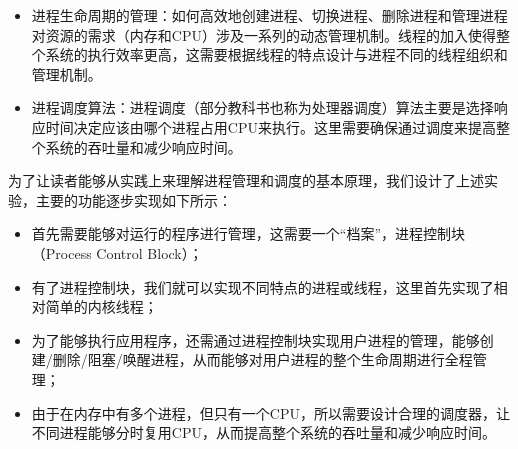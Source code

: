 \begin{itemize}
\item
  进程生命周期的管理：如何高效地创建进程、切换进程、删除进程和管理进程对资源的需求（内存和CPU）涉及一系列的动态管理机制。线程的加入使得整个系统的执行效率更高，这需要根据线程的特点设计与进程不同的线程组织和管理机制。
\item
  进程调度算法：进程调度（部分教科书也称为处理器调度）算法主要是选择响应时间决定应该由哪个进程占用CPU来执行。这里需要确保通过调度来提高整个系统的吞吐量和减少响应时间。
\end{itemize}

为了让读者能够从实践上来理解进程管理和调度的基本原理，我们设计了上述实验，主要的功能逐步实现如下所示：

\begin{itemize}
\item
  首先需要能够对运行的程序进行管理，这需要一个``档案''，进程控制块（Process
  Control Block）；
\item
  有了进程控制块，我们就可以实现不同特点的进程或线程，这里首先实现了相对简单的内核线程；
\item
  为了能够执行应用程序，还需通过进程控制块实现用户进程的管理，能够创建/删除/阻塞/唤醒进程，从而能够对用户进程的整个生命周期进行全程管理；
\item
  由于在内存中有多个进程，但只有一个CPU，所以需要设计合理的调度器，让不同进程能够分时复用CPU，从而提高整个系统的吞吐量和减少响应时间。
\end{itemize}
